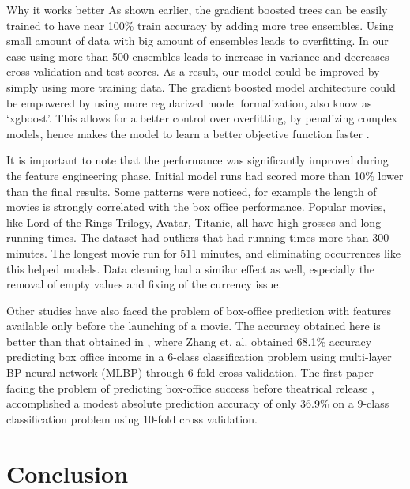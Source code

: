 Why it works better
As shown earlier, the gradient boosted trees can be easily trained to have near 100\% train accuracy by adding more tree ensembles. Using small amount of data with big amount of ensembles leads to overfitting. In our case using more than 500 ensembles leads to increase in variance and decreases cross-validation and  test scores. As a result, our model could be improved by simply using more training data. The gradient boosted model architecture could be empowered by using more regularized model formalization, also know as ‘xgboost’. This allows for a better control over overfitting, by penalizing complex models, hence makes the model to learn a better objective function faster \cite{chen2015}.  

It is important to note that the performance was significantly improved during the feature engineering phase. Initial model runs had scored more than 10\% lower than the final results. Some patterns were noticed, for example the length of movies is strongly correlated with the box office performance. Popular movies, like Lord of the Rings Trilogy, Avatar, Titanic, all have high grosses and long running times. The dataset had outliers that had running times more than 300 minutes. The longest movie run for 511 minutes,  and eliminating occurrences like this helped models. Data cleaning had a similar effect as well, especially the removal of empty values and fixing of the currency issue.

Other studies have also faced the problem of box-office prediction with features available only before the launching of a movie. The accuracy obtained here is better than that obtained in \cite{zhang2009forecasting}, where Zhang et. al. obtained 68.1\% accuracy predicting box office income in a 6-class classification problem using multi-layer BP neural network (MLBP) through 6-fold cross validation. The first paper facing the problem of predicting box-office success before theatrical release \cite{sharda2006predicting}, accomplished a modest absolute prediction accuracy of only 36.9\% on a 9-class classification problem using 10-fold cross validation. 



\section{Conclusion}
\blindtext[1]